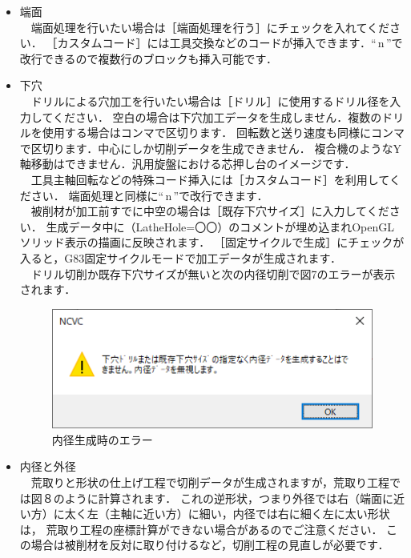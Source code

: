 \begin{itemize}
\item 端面\\
　端面処理を行いたい場合は［端面処理を行う］にチェックを入れてください．
［カスタムコード］には工具交換などのコードが挿入できます．``\,\yen{}n\,''で改行できるので複数行のブロックも挿入可能です．

\vspace*{1zh}
\item 下穴\\
　ドリルによる穴加工を行いたい場合は［ドリル］に使用するドリル径を入力してください．
空白の場合は下穴加工データを生成しません．複数のドリルを使用する場合はコンマで区切ります．
回転数と送り速度も同様にコンマで区切ります．中心にしか切削データを生成できません．
複合機のようなY軸移動はできません．汎用旋盤における芯押し台のイメージです．\\
　工具主軸回転などの特殊コード挿入には［カスタムコード］を利用してください．
端面処理と同様に``\,\yen{}n\,''で改行できます．\\
　被削材が加工前すでに中空の場合は［既存下穴サイズ］に入力してください．
生成データ中に（LatheHole=〇〇）のコメントが埋め込まれOpenGLソリッド表示の描画に反映されます．
［固定サイクルで生成］にチェックが入ると，G83固定サイクルモードで加工データが生成されます．\\
　ドリル切削か既存下穴サイズが無いと次の内径切削で図7のエラーが表示されます．

\begin{figure}[H]
\centering
\includegraphics[scale=0.8]{No2/fig/error.png}
\caption{内径生成時のエラー}
\label{fig:error.png}
\end{figure}

\vspace*{1zh}
\item 内径と外径\\
　荒取りと形状の仕上げ工程で切削データが生成されますが，荒取り工程では図８のように計算されます．
これの逆形状，つまり外径では右（端面に近い方）に太く左（主軸に近い方）に細い，内径では右に細く左に太い形状は，
荒取り工程の座標計算ができない場合があるのでご注意ください．
この場合は被削材を反対に取り付けるなど，切削工程の見直しが必要です．


\end{itemize}
